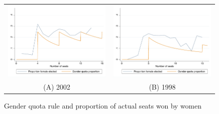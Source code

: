\begin{figure}[]



    \begin{tabular}{cc}
        \includegraphics[width=0.5\columnwidth]{figures/firstStage_elected_2002.pdf} & \includegraphics[width=0.5\columnwidth]{figures/firstStage_elected_1998.pdf} \\
        (A) 2002                                                                      & (B) 1998                                                                      
    \end{tabular}

    \caption{Gender quota rule and proportion of actual seats won by women}
    \label{fig:firstStage-elected}
\end{figure}